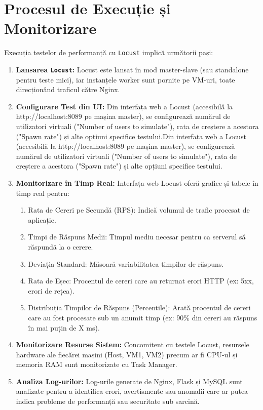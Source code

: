 \documentclass[12pt, a4paper, oneside, romanian]{teza-upb}
\begin{document}
\section{Procesul de Execuție și Monitorizare}
Execuția testelor de performanță cu \texttt{Locust} implică următorii pași:
\begin{enumerate}
	\item \textbf{Lansarea \texttt{Locust}:} Locust este lansat în mod master-slave (sau standalone pentru teste mici), iar instanțele worker sunt pornite pe VM-uri, toate direcționând traficul către Nginx.
	
	\item \textbf{Configurare Test din UI:} Din interfața web a Locust (accesibilă la http://localhost:8089 pe mașina master), se configurează numărul de utilizatori virtuali ("Number of users to simulate"), rata de creștere a acestora ("Spawn rate") și alte opțiuni specifice testului.Din interfața web a Locust (accesibilă la http://localhost:8089 pe mașina master), se configurează numărul de utilizatori virtuali ("Number of users to simulate"), rata de creștere a acestora ("Spawn rate") și alte opțiuni specifice testului.
	
	
	\item \textbf{Monitorizare în Timp Real:} Interfața web Locust oferă grafice și tabele în timp real pentru:
	\begin{enumerate}
		\item Rata de Cereri pe Secundă (RPS): Indică volumul de trafic procesat de aplicație.
		\item Timpi de Răspuns Medii: Timpul mediu necesar pentru ca serverul să răspundă la o cerere.
		\item Deviația Standard: Măsoară variabilitatea timpilor de răspuns.
		\item Rata de Eșec: Procentul de cereri care au returnat erori HTTP (ex: 5xx, erori de rețea).
		\item Distribuția Timpilor de Răspuns (Percentile): Arată procentul de cereri care au fost procesate sub un anumit timp (ex: 90\% din cereri au răspuns în mai puțin de X ms).
	\end{enumerate}
	
	\item \textbf{Monitorizare Resurse Sistem:} Concomitent cu testele Locust, resursele hardware ale fiecărei mașini (Host, VM1, VM2) precum ar fi CPU-ul și memoria RAM sunt monitorizate cu Task Manager. 
	
	\item \textbf{Analiza Log-urilor:} Log-urile generate de Nginx, Flask și MySQL sunt analizate pentru a identifica erori, avertismente sau anomalii care ar putea indica probleme de performanță sau securitate sub sarcină.
\end{enumerate}
\end{document}
